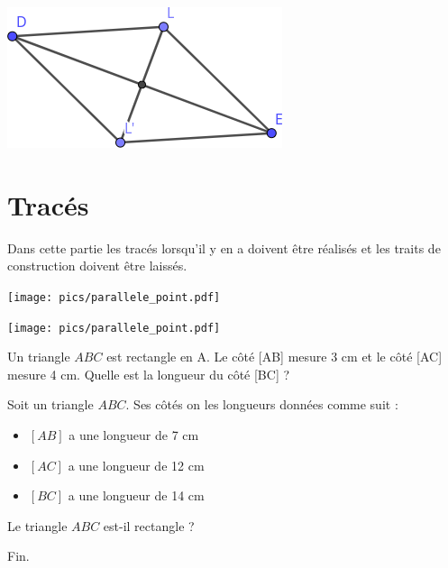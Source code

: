 \documentclass[a4paper,12pt]{scrartcl}
\begin{document}

\begin{center}
\includegraphics[width=0.4\linewidth]{pics/losange.png}
\end{center}

\section*{Tracés}

Dans cette partie les tracés lorsqu'il y en a doivent être réalisés  et les traits de construction doivent être laissés.


\begin{center}
\texttt{[image: pics/parallele\_point.pdf]}
\end{center}


\begin{center}
\texttt{[image: pics/parallele\_point.pdf]}
\end{center}


Un triangle $ABC$ est rectangle en A. Le côté [AB] mesure 3 cm et le côté [AC] mesure 4 cm. Quelle est la longueur du côté [BC] ?


Soit un triangle $ABC$. Ses côtés on les longueurs données comme suit : 

\begin{itemize}
\item $[AB]$ a une longueur de 7 cm
\item $[AC]$ a une longueur de 12 cm
\item $[BC]$ a une longueur de 14 cm
\end{itemize}

Le triangle $ABC$ est-il rectangle ?

\trait

\begin{center}
Fin.
\end{center}
\end{document}
